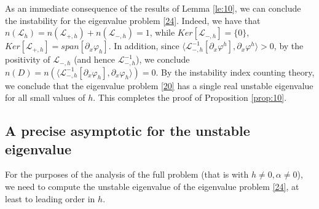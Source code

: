 \documentclass[12pt]{amsart}
\theoremstyle{definition}
\theoremstyle{remark}
\numberwithin{equation}{section}
\renewcommand{\(}{\left(}
\renewcommand{\)}{\right)}
\renewcommand{\[}{\left[}
\renewcommand{\]}{\right]}
\newcommand{\cl}{{\mathcal L}}
\newcommand{\al}{\alpha}
\newcommand{\vp}{\varphi}
\newcommand{\dpr}[2]{\langle #1,#2 \rangle}
\newcommand{\p}{\partial}
\begin{document}
 As an immediate consequence of the results of Lemma \ref{le:10}, we can conclude the instability for the eigenvalue problem \eqref{24}. Indeed, we have that $n(\cl_{h})=n(\cl_{+,h})+n(\cl_{-,h})=1$, while $Ker[\cl_{-,h}]=\{0\}$,
 $Ker[\cl_{+,h}]=span[\p_x \vp_h]$.  In addition, since   $\dpr{\cl_{-,h}^{-1} [\p_x \vp^h]}{\p_x \vp^h}>0$, by the positivity of $\cl_{-,h}$ (and hence $\cl_{-,h}^{-1}$), we conclude
 $
 n(D)= n(\dpr{ \cl_{-,h}^{-1}[\p_x \vp_h]}{\p_x \vp_h})=0.
 $
 By the instability index counting theory, we conclude that the eigenvalue problem \eqref{20} has a single real unstable eigenvalue for all small values of $h$. This completes the proof of Proposition \ref{prop:10}.
 \subsection{A precise asymptotic for the unstable eigenvalue}
 For the purposes of the analysis of the full problem (that is with $h\neq 0, \al\neq 0$), we need to compute the unstable eigenvalue of the eigenvalue  problem \eqref{24}, at least to leading order in $h$.
\end{document}
